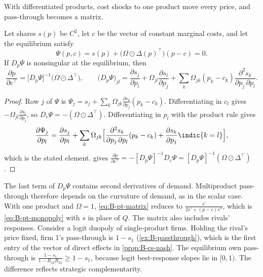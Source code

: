 With differentiated products, cost shocks to one product move every price, and pass-through becomes a matrix.

\begin{proposition}\label{prop:B-passthrough-matrix}
Let shares $s(p)$ be $C^2$, let $c$ be the vector of constant marginal costs, and let the equilibrium satisfy
\begin{equation*}
\Psi(p, c) = s(p) + \big(\Omega \odot \Delta(p)^\top\big)(p - c) = 0 .
\end{equation*}
If $D_p\Psi$ is nonsingular at the equilibrium, then
\begin{equation}\label{eq:B-pt-matrix}
\frac{\partial p}{\partial c^\top} = \big[D_p\Psi\big]^{-1}\big(\Omega \odot \Delta^\top\big) ,
\qquad
\big(D_p\Psi\big)_{jl} = \frac{\partial s_j}{\partial p_l} + \Omega_{jl}\frac{\partial s_l}{\partial p_j}
+ \sum_{k}\Omega_{jk}(p_k - c_k)\frac{\partial^2 s_k}{\partial p_j\,\partial p_l} .
\end{equation}
\end{proposition}

\begin{proof}
Row $j$ of $\Psi$ is $\Psi_j = s_j + \sum_k\Omega_{jk}\frac{\partial s_k}{\partial p_j}(p_k - c_k)$. Differentiating in $c_l$
gives $-\Omega_{jl}\frac{\partial s_l}{\partial p_j}$, so $D_c\Psi = -(\Omega \odot \Delta^\top)$. Differentiating in $p_l$ with the
product rule gives
\begin{equation*}
\frac{\partial \Psi_j}{\partial p_l} = \frac{\partial s_j}{\partial p_l}
+ \sum_k\Omega_{jk}\Big[\frac{\partial^2 s_k}{\partial p_j\,\partial p_l}(p_k - c_k) + \frac{\partial s_k}{\partial p_j}\indic\{k = l\}\Big] ,
\end{equation*}
which is the stated element.  gives
$\frac{\partial p}{\partial c^\top} = -[D_p\Psi]^{-1}D_c\Psi = [D_p\Psi]^{-1}(\Omega \odot \Delta^\top)$.
\end{proof}

The last term of $D_p\Psi$ contains second derivatives of demand. Multiproduct pass-through therefore depends on the
curvature of demand, as in the scalar case. With one product and $\Omega = 1$, \eqref{eq:B-pt-matrix} reduces to
$\frac{s'}{2s' + (p - c)s''}$, which is \eqref{eq:B-pt-monopoly} with $s$ in place of $Q$. The matrix also includes
rivals' responses. Consider a logit duopoly of single-product firms. Holding the rival's price fixed, firm 1's
pass-through is $1 - s_1$ (\cref{ex:B-passthrough}), which is the first entry of the vector of direct effects in
\cref{prop:B-cs-nash}. The
equilibrium own pass-through is $\frac{1 - s_1}{1 - R_{12}R_{21}} \geq 1 - s_1$, because logit best-response slopes lie in
$[0, 1)$. The difference reflects strategic complementarity.

